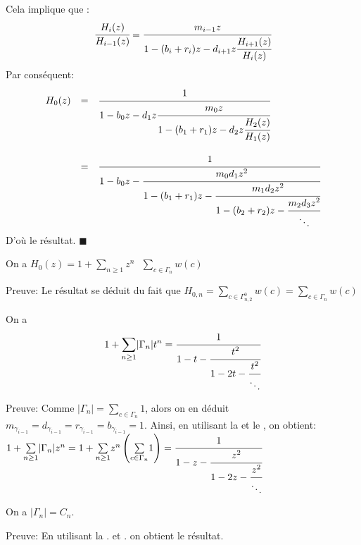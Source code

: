Cela implique que :\\
\[
	\cfrac{H_{i}(z)}{H_{i-1}(z)}=\cfrac{m_{i-1}z}{1-(b_{i}+r_{i})z-d_{i+1}z\cfrac{H_{i+1}(z)}{H_{i}(z)}}
\]
Par conséquent:
\[
	\begin{array}{r c l}
		H_{0}(z) & =       & \cfrac{1}{1-b_{0}z-d_{1}z\cfrac{m_{0}z}{1-(b_{1}+r_{1})z-d_{2}z\cfrac{H_{2}(z)}{H_{1}(z)}}}                   \\
		         & \text{} &                                                                                                               \\
		         & =       & \cfrac{1}{1-b_{0}z-\cfrac{m_{0}d_{1}z^2}{1-(b_{1}+r_{1})z-\cfrac{m_{1}d_{2}z^2}{1-(b_{2}+r_{2})z-\cfrac{m_{2}
			d_{3}z^2}{\ddots}}}}
	\end{array}
\]
D'où le résultat. \hspace{5pt}$\blacksquare$

\begin{corollaire} \label{H0(t)}
	On a $H_{0}(z) = 1 + \underset{n\geq 1}{\sum}z^{n}\text{ }\underset{c\in \Gamma_{n}}{\sum} w(c)$
\end{corollaire}
Preuve: Le résultat se déduit du fait que  $H_{0,n} = \underset{c\in \Gamma_{n,2}^{0}}{\sum}w(c) = \underset{c\in \Gamma_{n}}{\sum}w(c)$

\begin{proposition}\label{gamma-frac}
	On a \[1+\underset{n \geq 1}{\sum}|\Gamma_{n}|t^n = \cfrac{1}{1-t-\cfrac{t^2}{1-2t-\cfrac{t^2}{\ddots}}}\]
\end{proposition}
Preuve:
Comme $|\Gamma_{n}| = \underset{c\in \Gamma_{n}}{\sum}1 $, alors on en déduit
$m_{\gamma_{i-1}}=d_{\gamma_{i-1}}=r_{\gamma_{i-1}}=b_{\gamma_{i-1}}=1$. Ainsi, en
utilisant la  et le , on obtient:\\
$
	1+\underset{n \geq 1}{\sum}|\Gamma_{n}|z^n = 1 + \underset{n \geq 1}{\sum}z^n \left(
	\underset{c\in \Gamma_{n}}{\sum}1  \right) = \cfrac{1}{1-z-\cfrac{z^2}{1-2z-
			\cfrac{z^2}{\ddots}}}
$

\begin{corollaire}
	On a $|\Gamma_{n}|=C_{n}$.
\end{corollaire}
Preuve: En utilisant la . et . on
obtient le résultat.\\

